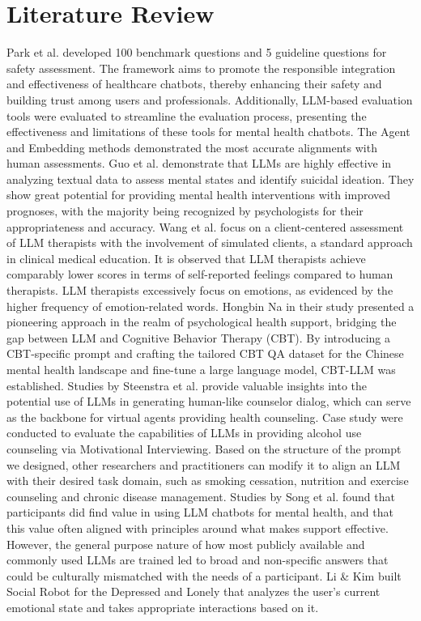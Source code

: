 \section{Literature Review}
Park et al. \cite{park2024building} developed 100 benchmark questions and 5 guideline questions for safety assessment. The framework aims to promote the responsible integration and effectiveness of healthcare chatbots, thereby enhancing their safety and building trust among users and professionals. Additionally, LLM-based evaluation tools were evaluated to streamline the evaluation process, presenting the effectiveness and limitations of these tools for mental health chatbots. The Agent and Embedding methods demonstrated the most accurate alignments with human assessments. Guo et al. \cite{guo2024large} demonstrate that LLMs are highly effective in analyzing textual data to assess mental states and identify suicidal ideation. They show great potential for providing mental health interventions with improved prognoses, with the majority being recognized by psychologists for their appropriateness and accuracy. Wang et al. \cite{wang2024towards} focus on a client-centered assessment of LLM therapists with the involvement of simulated clients, a standard approach in clinical medical education. It is observed that LLM therapists achieve comparably lower scores in terms of self-reported feelings compared to human therapists. LLM therapists excessively focus on emotions, as evidenced by the higher frequency of emotion-related words. Hongbin Na \cite{na2024cbt} in their study presented a pioneering approach in the realm of psychological health support, bridging the gap between LLM and Cognitive Behavior Therapy (CBT). By introducing a CBT-specific prompt and crafting the tailored CBT QA dataset for the Chinese mental health landscape and fine-tune a large language model, CBT-LLM was established. Studies by Steenstra et al. \cite{steenstra2024virtual}  provide valuable insights into the potential use of LLMs in generating human-like counselor dialog, which can serve as the backbone for virtual agents providing health counseling. Case study were conducted to evaluate the capabilities of LLMs in providing alcohol use counseling via Motivational Interviewing. Based on the structure of the prompt we designed, other researchers and practitioners can modify it to align an LLM with their desired task domain, such as smoking cessation, nutrition and exercise counseling and chronic disease management. Studies by Song et al. \cite{song2024typing} found that participants did find value in using LLM chatbots for mental health, and that this value often aligned with principles around what makes support effective. However, the general purpose nature of how most publicly available and commonly used LLMs are trained led to broad and non-specific answers that could be culturally mismatched with the needs of a participant. Li \& Kim \cite{lisocial} built Social Robot for the Depressed and Lonely that analyzes the user's current emotional state and takes appropriate interactions based on it. \\
